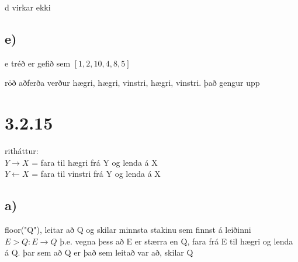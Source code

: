 \documentclass{article}
\begin{document}
d virkar ekki

\subsection*{e)}
e tréð er gefið sem $[1,2,10,4,8,5]$

röð aðferða verður hægri, hægri, vinstri, hægri, vinstri.
það gengur upp

\section*{3.2.15}
ritháttur:\\
$Y\rightarrow X$ = fara til hægri frá Y og lenda á X \\$Y\leftarrow X$ = fara til vinstri frá Y og lenda á X
\subsection*{a)}
floor("Q"), leitar að Q og skilar minnsta stakinu sem finnst á leiðinni\\
$E>Q:E\rightarrow Q$ þ.e. vegna þess að E er stærra en Q, fara frá E til hægri og lenda á Q. 
þar sem að Q er það sem leitað var að, skilar Q
\end{document}
